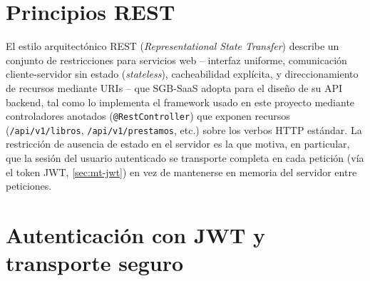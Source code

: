 \section{Principios REST}
\label{sec:mt-rest}

El estilo arquitectónico REST (\emph{Representational State Transfer})
describe un conjunto de restricciones para servicios web -- interfaz
uniforme, comunicación cliente-servidor sin estado (\emph{stateless}),
cacheabilidad explícita, y direccionamiento de recursos mediante URIs --
que SGB-SaaS adopta para el diseño de su API backend, tal como lo
implementa el framework usado en este proyecto \citep{walls2022springinaction}
mediante controladores anotados (\texttt{@RestController}) que exponen
recursos (\texttt{/api/v1/libros}, \texttt{/api/v1/prestamos}, etc.) sobre
los verbos HTTP estándar. La restricción de ausencia de estado en el
servidor es la que motiva, en particular, que la sesión del usuario
autenticado se transporte completa en cada petición (vía el token JWT,
\autoref{sec:mt-jwt}) en vez de mantenerse en memoria del servidor entre
peticiones.

\section{Autenticación con JWT y transporte seguro}
\label{sec:mt-jwt}

